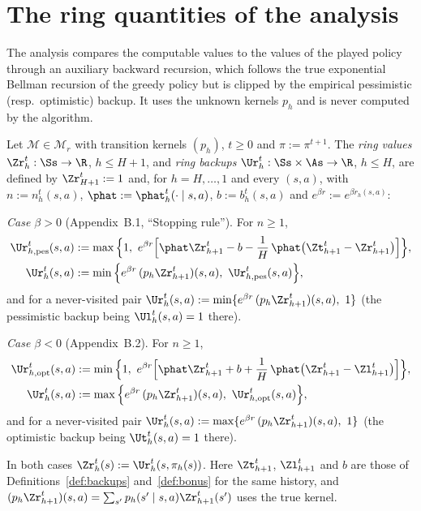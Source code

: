 \section{The ring quantities of the analysis}
\label{sec:algorithm_ring}

The analysis compares the computable values to the values of the played policy through an
auxiliary backward recursion, which follows the true exponential Bellman recursion of the
greedy policy but is clipped by the empirical pessimistic (resp.\ optimistic) backup. It uses
the unknown kernels $p_h$ and is never computed by the algorithm.

\begin{definition}\label{def:ring}
\leanok
{}
Let $\mathcal M \in \mathcal M_r$ with transition kernels $(p_h)$, $t \ge 0$ and $\pi := \pi^{t+1}$. The
\emph{ring values} $\Zr^t_h : \Ss \to \R$, $h \le H + 1$, and \emph{ring backups}
$\Ur^t_h : \Ss \times \As \to \R$, $h \le H$, are defined by $\Zr^t_{H+1} := 1$ and, for $h = H, \dots, 1$
and every $(s, a)$, with $n := n_h^t(s, a)$, $\phat := \phat_h^t(\cdot \mid s, a)$, $b := b_h^t(s, a)$
and $e^{\beta r} := e^{\beta r_h(s, a)}$:

\emph{Case $\beta > 0$} (Appendix~B.1, ``Stopping rule''). For $n \ge 1$,
\begin{align*}
  \Ur^t_{h, \mathrm{pes}}(s, a) &:= \max\Big\{ 1,\ e^{\beta r} \Big[ \phat \Zr^t_{h+1} - b - \frac1H\, \phat\big(\Zt^t_{h+1} - \Zr^t_{h+1}\big) \Big] \Big\}, \\
  \Ur^t_h(s, a) &:= \min\Big\{ e^{\beta r}\, (p_h \Zr^t_{h+1})(s, a),\ \Ur^t_{h, \mathrm{pes}}(s, a) \Big\},
\end{align*}
and for a never-visited pair $\Ur^t_h(s, a) := \min\{ e^{\beta r}\, (p_h \Zr^t_{h+1})(s, a),\ 1\}$
(the pessimistic backup being $\Ul^t_h(s, a) = 1$ there).

\emph{Case $\beta < 0$} (Appendix~B.2). For $n \ge 1$,
\begin{align*}
  \Ur^t_{h, \mathrm{opt}}(s, a) &:= \min\Big\{ 1,\ e^{\beta r} \Big[ \phat \Zr^t_{h+1} + b + \frac1H\, \phat\big(\Zr^t_{h+1} - \Zl^t_{h+1}\big) \Big] \Big\}, \\
  \Ur^t_h(s, a) &:= \max\Big\{ e^{\beta r}\, (p_h \Zr^t_{h+1})(s, a),\ \Ur^t_{h, \mathrm{opt}}(s, a) \Big\},
\end{align*}
and for a never-visited pair $\Ur^t_h(s, a) := \max\{ e^{\beta r}\, (p_h \Zr^t_{h+1})(s, a),\ 1\}$
(the optimistic backup being $\Ut^t_h(s, a) = 1$ there).

In both cases $\Zr^t_h(s) := \Ur^t_h(s, \pi_h(s))$. Here $\Zt^t_{h+1}$, $\Zl^t_{h+1}$ and $b$ are those
of Definitions~\ref{def:backups} and~\ref{def:bonus} for the same history, and
$(p_h \Zr^t_{h+1})(s, a) = \sum_{s'} p_h(s' \mid s, a)\Zr^t_{h+1}(s')$ uses the true kernel.
\end{definition}

